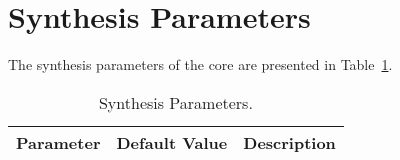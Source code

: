 \section{Synthesis Parameters}
\label{sec:sp}

The synthesis parameters of the core are presented in Table~\ref{tab:sp}.

\begin{table}[H]
  \centering
    \begin{tabularx}{\textwidth}{ | c | c | X | }
    \hline
    \rowcolor{iob-green}
    {\bf Parameter} & {\bf Default Value} & {\bf Description} \\\hline

    

    \end{tabularx}
  \caption{Synthesis Parameters.}
  \label{tab:sp}
\end{table}
